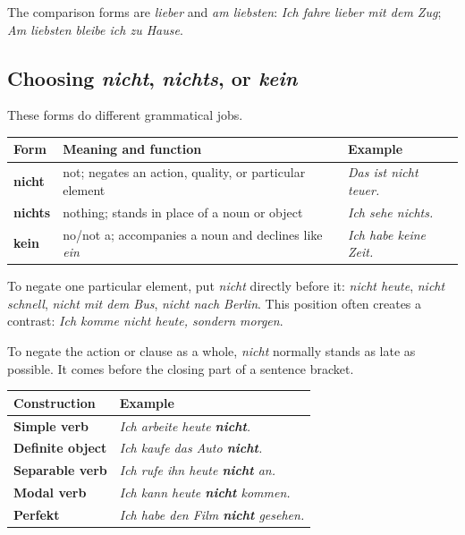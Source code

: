 The comparison forms are \textit{lieber} and \textit{am liebsten}:
\textit{Ich fahre lieber mit dem Zug};
\textit{Am liebsten bleibe ich zu Hause}.

\subsection{Choosing \textit{nicht}, \textit{nichts}, or \textit{kein}}

These forms do different grammatical jobs.

\begin{center}
\small
{}
\begin{tabularx}{\textwidth}{@{}>{\bfseries}l l X@{}}
\toprule
Form & Meaning and function & Example \\
\midrule
nicht & not; negates an action, quality, or particular element
      & \textit{Das ist nicht teuer.} \\
nichts & nothing; stands in place of a noun or object
       & \textit{Ich sehe nichts.} \\
kein & no/not a; accompanies a noun and declines like \textit{ein}
     & \textit{Ich habe keine Zeit.} \\
\bottomrule
\end{tabularx}
\end{center}

To negate one particular element, put \textit{nicht} directly before it:
\textit{nicht heute}, \textit{nicht schnell}, \textit{nicht mit dem Bus},
\textit{nicht nach Berlin}. This position often creates a contrast:
\textit{Ich komme nicht heute, sondern morgen}.

To negate the action or clause as a whole, \textit{nicht} normally stands as
late as possible. It comes before the closing part of a sentence bracket.

\begin{center}
\small
{}
\begin{tabularx}{\textwidth}{@{}>{\bfseries}l X@{}}
\toprule
Construction & Example \\
\midrule
Simple verb & \textit{Ich arbeite heute \textbf{nicht}.} \\
Definite object & \textit{Ich kaufe das Auto \textbf{nicht}.} \\
Separable verb & \textit{Ich rufe ihn heute \textbf{nicht} an.} \\
Modal verb & \textit{Ich kann heute \textbf{nicht} kommen.} \\
Perfekt & \textit{Ich habe den Film \textbf{nicht} gesehen.} \\
\bottomrule
\end{tabularx}
\end{center}

